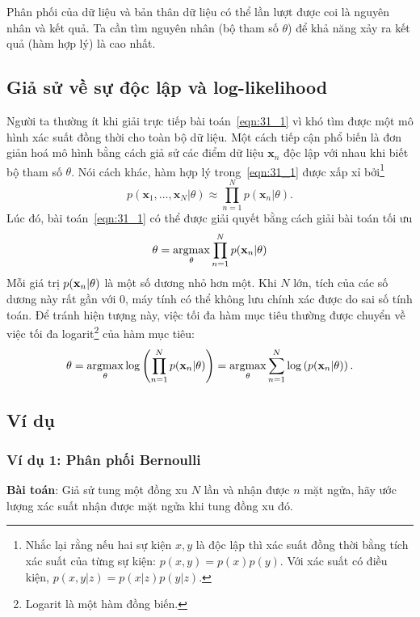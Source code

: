 Phân phối của dữ liệu và bản thân dữ liệu có thể lần lượt được coi là nguyên nhân và kết quả. Ta cần tìm nguyên nhân (bộ tham số $\theta$) để khả năng xảy ra kết quả (hàm hợp lý) là cao nhất.


\subsection{Giả sử về sự độc lập và log-likelihood}
Người ta thường ít khi giải trực tiếp bài toán~\eqref{eqn:31_1} vì khó tìm được
một mô hình xác suất đồng thời cho toàn bộ dữ liệu. Một cách tiếp cận phổ biến là đơn giản hoá mô hình bằng cách giả sử các điểm dữ liệu $\mathbf{x}_n$
độc lập với nhau khi biết bộ tham số $\theta$. Nói cách khác, hàm hợp lý trong~\eqref{eqn:31_1} được xấp xỉ
bởi\footnote{Nhắc lại rằng nếu hai sự kiện $x, y$ là độc lập thì xác suất đồng thời bằng tích xác suất của từng sự kiện: $p(x, y) = p(x)p(y)$. Với
xác suất có điều kiện, $p(x, y | z) = p(x|z)p(y|z)$.}
\begin{equation}
\label{eqn:31_2}
p(\mathbf{x}_1, \dots, \mathbf{x}_N | \theta) \approx \prod_{n = 1}^N p(\mathbf{x}_n |\theta).
\end{equation}
Lúc đó, bài toán~\eqref{eqn:31_1}
có thể được giải quyết bằng cách giải bài toán tối ưu
\begin{equation}
\label{eqn:31_3}
\theta = \operatorname*{argmax}_{\theta} \prod_{n=1}^N p(\mathbf{x}_n| \theta)
\end{equation}
Mỗi giá trị $p(\mathbf{x}_n |\theta)$ là một số dương nhỏ hơn một. Khi $N$ lớn, tích của các số dương này rất gần với 0, máy tính có thể không lưu chính xác được do sai số tính toán. Để tránh hiện tượng này, việc tối đa hàm mục tiêu thường được chuyển về việc tối đa logarit\footnote{Logarit là một hàm đồng biến.} của hàm mục tiêu:
\begin{equation}
\label{eqn:31_4}
\theta = \operatorname*{argmax}_{\theta} \log\left(\prod_{n=1}^N p(\mathbf{x}_n| \theta)\right) = \operatorname*{argmax}_{\theta} \sum_{n = 1}^N \log\left(p(\mathbf{x}_n | \theta)
\right).
\end{equation}




\subsection{Ví dụ}

\subsubsection{Ví dụ 1: Phân phối Bernoulli}
\textbf{Bài toán}: Giả sử tung một đồng xu $N$ lần và nhận được $n$ mặt
ngửa, hãy ước lượng xác suất nhận được mặt ngửa khi tung đồng xu đó.

